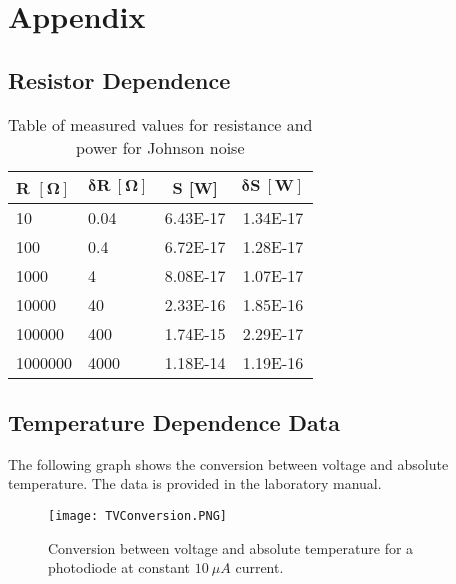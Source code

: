 \section*{Appendix}

\subsection*{Resistor Dependence}

\begin{table}[H]
	\centering
	\begin{tabular}{l l c c} \toprule
		\textbf{R} $\mathbf{[\Omega]}$ & $\mathbf{\delta R \ [\Omega]}$ & \textbf{S [W]}   & $\mathbf{\delta S \ [W]}$  \\ \toprule
		10      & 0.04 & 6.43E-17 & 1.34E-17 \\
		100     & 0.4  & 6.72E-17 & 1.28E-17 \\
		1000    & 4    & 8.08E-17 & 1.07E-17 \\
		10000   & 40   & 2.33E-16 & 1.85E-16 \\
		100000  & 400  & 1.74E-15 & 2.29E-17 \\
		1000000 & 4000 & 1.18E-14 & 1.19E-16 \\
		\bottomrule  
	\end{tabular}
	\caption{Table of measured values for resistance and power for Johnson noise}
	\label{johnsonRTable}
\end{table}

\subsection*{Temperature Dependence Data}
The following graph shows the conversion between voltage and absolute temperature. The data is provided in the laboratory manual.

\begin{figure}[H]
	\centering
	\texttt{[image: TVConversion.PNG]}
	\caption{Conversion between voltage and absolute temperature for a photodiode at constant $10 \ \mu A$ current.}
	\label{tvgraph}
\end{figure}


